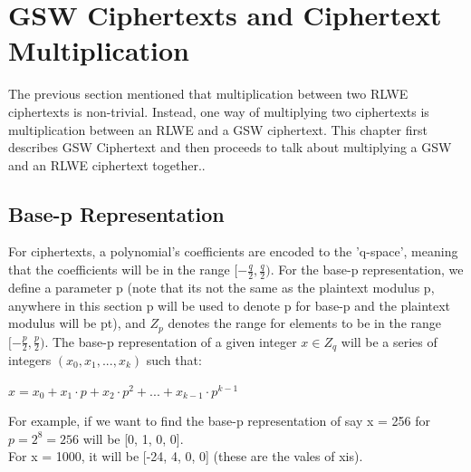 \documentclass{report}
\begin{document}
\chapter{GSW Ciphertexts and Ciphertext Multiplication}
	The previous section mentioned that multiplication between two RLWE ciphertexts is non-trivial. Instead, one way of multiplying two ciphertexts is multiplication between an RLWE and a GSW ciphertext. This chapter first describes GSW Ciphertext and then proceeds to talk about multiplying a GSW and an RLWE ciphertext together..
	
	\section{Base-p Representation}
	For ciphertexts, a polynomial's coefficients are encoded to the 'q-space', meaning that the coefficients will be in the range $[-\frac{q}{2}, \frac{q}{2})$. For the base-p representation, we define a parameter p (note that its not the same as the plaintext modulus p, anywhere in this section p will be used to denote p for base-p and the plaintext modulus will be pt), and $Z_p$ denotes the range for elements to be in the range $[-\frac{p}{2}, \frac{p}{2})$. The base-p representation of a given integer $x \in Z_q$ will be a series of integers $(x_0, x_1, ..., x_k)$ such that:
	\begin{center}
		$x = x_0 + x_1 \cdot p + x_2 \cdot p^2 + ... + x_{k-1} \cdot p^{k-1}$
	\end{center}
	For example, if we want to find the base-p representation of say x = 256 for $p = 2^8 = 256$ will be [0, 1, 0, 0].\\
	For x = 1000, it will be [-24, 4, 0, 0] (these are the vales of xis).
	
\end{document}
